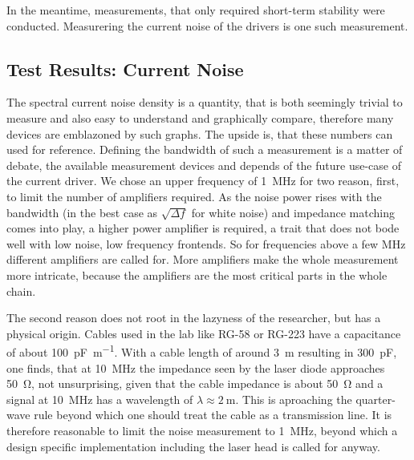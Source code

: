 In the meantime, measurements, that only required short-term stability were conducted. Measurering the current noise of the drivers is one such measurement.

\clearpage
\subsection{Test Results: Current Noise}
\label{sec:results_current_noise}
The spectral current noise density is a quantity, that is both seemingly trivial to measure and also easy to understand and graphically compare, therefore many devices are emblazoned by such graphs. The upside is, that these numbers can used for reference. Defining the bandwidth of such a measurement is a matter of debate, the available measurement devices and depends of the future use-case of the current driver. We chose an upper frequency of \qty{1}{\MHz} for two reason, first, to limit the number of amplifiers required. As the noise power rises with the bandwidth (in the best case as $\sqrt{\Delta f}$ for white noise) and impedance matching comes into play, a higher power amplifier is required, a trait that does not bode well with low noise, low frequency frontends. So for frequencies above a few \unit{\MHz} different amplifiers are called for. More amplifiers make the whole measurement more intricate, because the amplifiers are the most critical parts in the whole chain.

The second reason does not root in the lazyness of the researcher, but has a physical origin. Cables used in the lab like RG-58 or RG-223 have a capacitance of about \qty{100}{\pF \per \m}. With a cable length of around \qty{3}{\m} resulting in \qty{300}{\pF}, one finds, that at \qty{10}{\MHz} the impedance seen by the laser diode approaches \qty{50}{\ohm}, not unsurprising, given that the cable impedance is about \qty{50}{\ohm} and a signal at \qty{10}{\MHz} has a wavelength of $\lambda \approx \qty{2}{\m}$. This is aproaching the quarter-wave rule beyond which one should treat the cable as a transmission line. It is therefore reasonable to limit the noise measurement to \qty{1}{\MHz}, beyond which a design specific implementation including the laser head is called for anyway.

\clearpage
